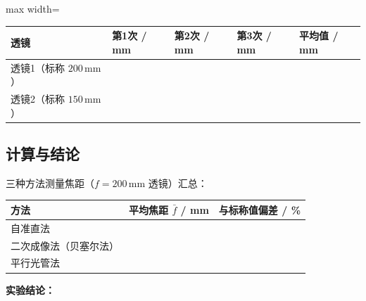 \documentclass[12pt, a4paper]{article}
\begin{document}
\begin{table}[H]
  \centering
  \begin{adjustbox}{max width=\textwidth}
    \begin{tabular}{>{\centering\arraybackslash}m{4.5cm}
                    >{\centering\arraybackslash}m{2.5cm}
                    >{\centering\arraybackslash}m{2.5cm}
                    >{\centering\arraybackslash}m{2.5cm}
                    >{\centering\arraybackslash}m{3cm}}
      \toprule
      透镜 & 第1次 / mm & 第2次 / mm & 第3次 / mm & 平均值 / mm \\
      \midrule
      透镜1（标称 $200\,\text{mm}$） & & & & \\[0.8cm]
      透镜2（标称 $150\,\text{mm}$） & & & & \\[0.8cm]
      \bottomrule
    \end{tabular}
  \end{adjustbox}
\end{table}

\vspace{1cm}

\subsection*{计算与结论}

\noindent 三种方法测量焦距（$f = 200\,\text{mm}$ 透镜）汇总：

\vspace{0.3cm}
\begin{table}[H]
  \centering
  \begin{tabular}{>{\centering\arraybackslash}m{5cm}
                  >{\centering\arraybackslash}m{4cm}
                  >{\centering\arraybackslash}m{4cm}}
    \toprule
    方法 & 平均焦距 $\bar{f}$ / mm & 与标称值偏差 / \% \\
    \midrule
    自准直法 & & \\[0.6cm]
    二次成像法（贝塞尔法）& & \\[0.6cm]
    平行光管法 & & \\[0.6cm]
    \bottomrule
  \end{tabular}
\end{table}

\vspace{2cm}

\noindent\textbf{实验结论：}

\vspace{4cm}
\end{document}
